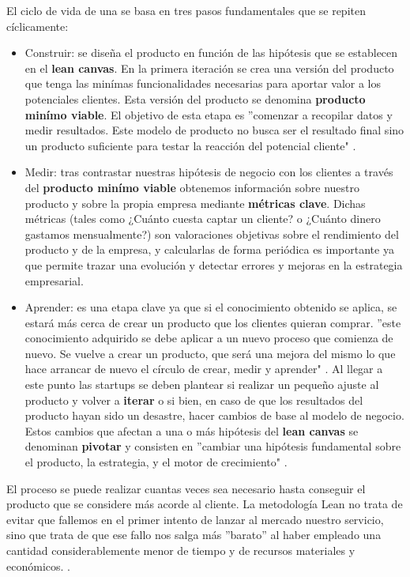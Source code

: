 El ciclo de vida de una  se basa en tres pasos fundamentales que se repiten cíclicamente:
\begin{itemize}
	\item Construir: se diseña el producto en función de las hipótesis que se establecen en el \textbf{lean canvas}. En la primera iteración se crea una versión del producto que tenga las minímas funcionalidades necesarias para aportar valor a los potenciales clientes. Esta versión del producto se denomina \textbf{producto minímo viable}. El objetivo de esta etapa es ''comenzar a recopilar datos y medir resultados. Este modelo de producto no busca ser el resultado final sino un producto suficiente para testar la reacción del potencial cliente" \cite{antevenio2016}.
	\item Medir: tras contrastar nuestras hipótesis de negocio con los clientes a través del \textbf{producto minímo viable} obtenemos información sobre nuestro producto y sobre la propia empresa mediante \textbf{métricas clave}. Dichas métricas (tales como ¿Cuánto cuesta captar un cliente? o ¿Cuánto dinero gastamos mensualmente?) son valoraciones objetivas sobre el rendimiento del producto y de la empresa, y calcularlas de forma periódica es importante ya que permite trazar una evolución y detectar errores y mejoras en la estrategia empresarial.
	\item Aprender: es una etapa clave ya que si el conocimiento obtenido se aplica, se estará más cerca de crear un producto que los clientes quieran comprar. ''este conocimiento adquirido se debe aplicar a un nuevo proceso que comienza de nuevo. Se vuelve a crear un producto, que será una mejora del mismo lo que hace arrancar de nuevo el círculo de crear, medir y aprender" \cite{antevenio2016}. Al llegar a este punto las startups se deben plantear si realizar un pequeño ajuste al producto y volver a \textbf{iterar} o si bien, en caso de que los resultados del producto hayan sido un desastre, hacer cambios de base al modelo de negocio. Estos cambios que afectan a una o más hipótesis del \textbf{lean canvas} se denominan \textbf{pivotar} y consisten en ''cambiar una hipótesis fundamental sobre el producto, la estrategia, y el motor de crecimiento" \cite{emooc}.
\end{itemize}

El proceso se puede realizar cuantas veces sea necesario hasta conseguir el producto que se considere más acorde al cliente. La metodología Lean  no trata de evitar que fallemos en el primer intento de lanzar al mercado nuestro servicio, sino que trata de que ese fallo nos salga más ''barato'' al haber empleado una cantidad considerablemente menor de tiempo y de recursos materiales y económicos. \cite{andreapelaez} .

